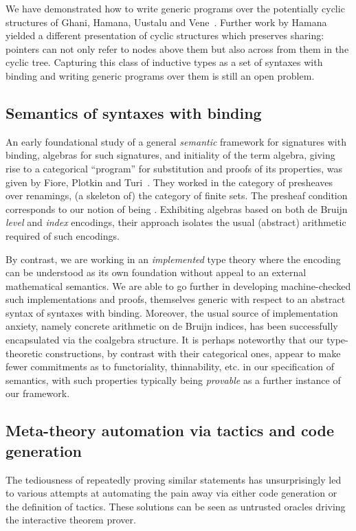 {We have demonstrated how to write generic programs over the potentially
cyclic structures of Ghani, Hamana, Uustalu and Vene~\citeyear{ghani2006representing}.
Further work by Hamana~\citeyear{Hamana2009} yielded a different presentation
of cyclic structures which preserves sharing: pointers can not only refer
to nodes above them but also across from them in the cyclic tree. Capturing
this class of inductive types as a set of syntaxes with binding and writing
generic programs over them is still an open problem.

\subsection{Semantics of syntaxes with binding} An early foundational study
of a general \emph{semantic} framework for signatures with binding, algebras
for such signatures, and initiality of the term algebra, giving rise to a
categorical ``program'' for substitution and proofs of its properties, was given
by Fiore, Plotkin and Turi~\cite{FiorePlotkinTuri99}. They worked in the category of presheaves
over renamings, (a skeleton of) the category of finite sets. The presheaf
condition corresponds to our notion of being . Exhibiting
algebras based on both de Bruijn \emph{level} and \emph{index} encodings,
their approach isolates the usual (abstract) arithmetic required of such encodings.

By contrast, we are working in an \emph{implemented} type theory where the
encoding can be understood as its own foundation without appeal to an external
mathematical semantics. We are able to go further in developing machine-checked
such implementations and proofs, themselves generic with respect to an abstract syntax
 of syntaxes with binding. Moreover, the usual source of implementation
anxiety, namely concrete arithmetic on de Bruijn indices, has been successfully
encapsulated via the  coalgebra structure. It is perhaps noteworthy that
our type-theoretic constructions, by contrast with their categorical ones,
appear to make fewer commitments as to functoriality, thinnability, etc. in our
specification of semantics, with such properties typically being \emph{provable}
as a further instance of our framework.

\subsection{Meta-theory automation via tactics and code generation} The
tediousness of repeatedly
proving similar statements has unsurprisingly led to various attempts at
automating the pain away via either code generation or the definition of
tactics. These solutions can be seen as untrusted oracles driving the
interactive theorem prover.

}
